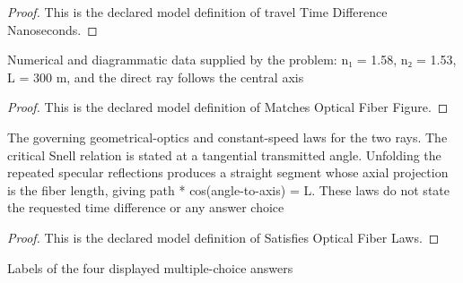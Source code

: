 \begin{proof}
  This is the declared model definition of travel Time Difference Nanoseconds.
\end{proof}
\begin{definition}
  \label{def:physics:phyx-mini-0086:phyxminiproblems-problemphyxmini0086-matchesopticalfiberfigure}
  Numerical and diagrammatic data supplied by the problem: n₁ = 1.58, n₂ = 1.53, L = 300 m, and the direct ray follows the central axis
\end{definition}
\begin{proof}
  This is the declared model definition of Matches Optical Fiber Figure.
\end{proof}
\begin{definition}
  \label{def:physics:phyx-mini-0086:phyxminiproblems-problemphyxmini0086-satisfiesopticalfiberlaws}
  The governing geometrical-optics and constant-speed laws for the two rays. The critical Snell relation is stated at a tangential transmitted angle. Unfolding the repeated specular reflections produces a straight segment whose axial projection is the fiber length, giving path * cos(angle-to-axis) = L. These laws do not state the requested time difference or any answer choice
\end{definition}
\begin{proof}
  This is the declared model definition of Satisfies Optical Fiber Laws.
\end{proof}
\begin{definition}
  \label{def:physics:phyx-mini-0086:phyxminiproblems-problemphyxmini0086-answerchoice}
  Labels of the four displayed multiple-choice answers
\end{definition}
